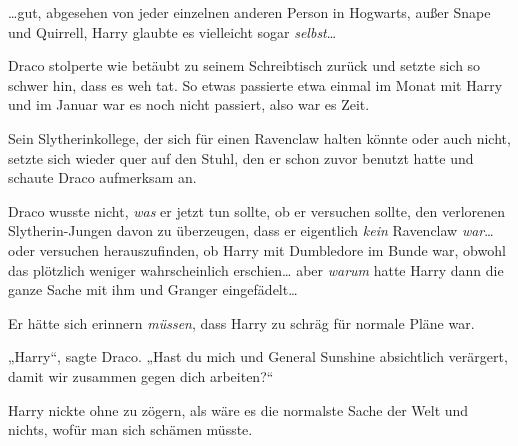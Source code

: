 …gut, abgesehen von jeder einzelnen anderen Person in Hogwarts, außer Snape und Quirrell, Harry glaubte es vielleicht sogar \emph{selbst}…

Draco stolperte wie betäubt zu seinem Schreibtisch zurück und setzte sich so schwer hin, dass es weh tat. So etwas passierte etwa einmal im Monat mit Harry und im Januar war es noch nicht passiert, also war es Zeit.

Sein Slytherinkollege, der sich für einen Ravenclaw halten könnte oder auch nicht, setzte sich wieder quer auf den Stuhl, den er schon zuvor benutzt hatte und schaute Draco aufmerksam an.

Draco wusste nicht, \emph{was} er jetzt tun sollte, ob er versuchen sollte, den verlorenen Slytherin-Jungen davon zu überzeugen, dass er eigentlich \emph{kein} Ravenclaw \emph{war}… oder versuchen herauszufinden, ob Harry mit Dumbledore im Bunde war, obwohl das plötzlich weniger wahrscheinlich erschien… aber \emph{warum} hatte Harry dann die ganze Sache mit ihm und Granger eingefädelt…

Er hätte sich erinnern \emph{müssen}, dass Harry zu schräg für normale Pläne war.

„Harry“, sagte Draco. „Hast du mich und General Sunshine absichtlich verärgert, damit wir zusammen gegen dich arbeiten?“

Harry nickte ohne zu zögern, als wäre es die normalste Sache der Welt und nichts, wofür man sich schämen müsste.

